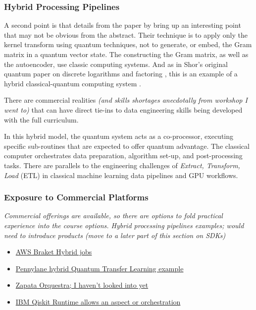 \subsubsection{Hybrid Processing Pipelines}

A second point is that details from the paper by \citeauthor{Kyriienko:2022} 
bring up an interesting point that may not be obvious from the abstract. 
Their technique is to apply only the kernel transform using quantum techniques, 
not to generate, or embed, the Gram matrix in a quantum vector state.
The constructing the Gram matrix, as well as the autoencoder, use classic computing systems. 
And as in Shor's original quantum paper on discrete logarithms and factoring \cite{Shor:1994},
this is an example of a hybrid classical-quantum computing system \cite{Preskill:2023}.

There are commercial realities \emph{(and skills shortages anecdotally from workshop I went to)}
that can have direct tie-ins to data engineering skills being developed with the full curriculum.

In this hybrid model, 
the quantum system acts as a co-processor, executing specific sub-routines that are expected to offer quantum advantage.
The classical computer orchestrates data preparation, algorithm set-up, and post-processing tasks.
There are parallels to the engineering challenges of \emph{Extract, Transform, Load} (ETL) 
in classical machine learning data pipelines and GPU workflows.

\subsubsection{Exposure to Commercial Platforms}

\emph{Commercial offerings are available, so there are options to fold practical experience into the course options.
	Hybrid processing pipelines examples; would need to introduce products (move to a later part of this section on SDKs)}

\begin{itemize}
	\item \href{https://docs.aws.amazon.com/braket/latest/developerguide/braket-what-is-hybrid-job.html}
	{AWS Braket Hybrid jobs}
	\item \href{https://pennylane.ai/qml/demos/tutorial_quantum_transfer_learning}
	{Pennylane hybrid Quantum Transfer Learning example}
	\item \href{https://ml2quantum.com/2020/05/22/zapata-orquestra/}
	{Zapata Orquestra; I haven't looked into yet}
	\item \href{https://docs.quantum.ibm.com/api/qiskit-ibm-runtime/0.16/runtime-service
	}{IBM Qiskit Runtime allows an aspect or orchestration}
\end{itemize}

